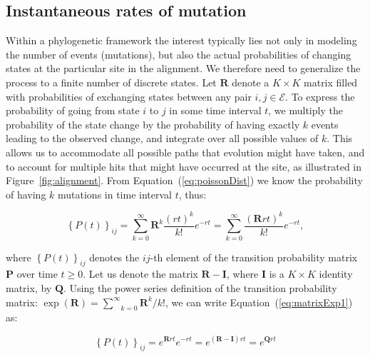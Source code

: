 
\subsection{Instantaneous rates of mutation\label{sub:rates}}

Within a phylogenetic framework the interest typically lies not only in modeling the number of events (mutations), but also the actual probabilities of changing states at the particular site in the alignment. 
We therefore need to generalize the process to a finite number of discrete states.
Let $\mathbf{R}$ denote a $K \times K$ matrix filled with probabilities of exchanging states between any pair $i,j\in \mathcal{E}$.
To express the probability of going from state $i$ to $j$ in some time interval $t$, we multiply the probability of the state change by the probability of having exactly $k$ events leading to the observed change, and integrate over all possible values of $k$.
This allows us to accommodate all possible paths that evolution might have taken, and to account for multiple hits that might have occurred at the site, as illustrated in Figure~\ref{fig:alignment}.
From Equation~(\ref{eq:poissonDist}) we know the probability of having $k$ mutations in time interval $t$, thus:

\begin{equation}
\left\{ P(t)\right\} _{ij}=\underset{k=0}{\overset{\infty}{\sum}}\mathbf{R}^{k}\frac{(r t)^{k}}{k!}e^{-r t}=\underset{k=0}{\overset{\infty}{\sum}}\frac{(\mathbf{R}r t)^{k}}{k!}e^{-r t},
\label{eq:matrixExp1}
\end{equation}

\noindent
where $\left\{ P(t)\right\} _{ij}$ denotes the $ij\text{-th}$ element of the transition probability matrix $\mathbf{P}$ over time $t \geq 0$.
Let us denote the matrix $\mathbf{R}-\mathbf{I}$, where $\mathbf{I}$ is a $K \times K$ identity matrix, by $\mathbf{Q}$.
Using the power series definition of the transition probability matrix: $\exp(\mathbf{R})=\underset{k=0}{\overset{\infty}{\sum}}\mathbf{R}^{k}/k!$, we can write Equation~(\ref{eq:matrixExp1}) as:

\begin{equation}
\left\{ P(t)\right\} _{ij}=e^{\mathbf{R}r t}e^{-r t} =e^{(\mathbf{R}-\mathbf{I})r t}=e^{\mathbf{Q}r t} 
\label{eq:matrixExp2}
\end{equation}

